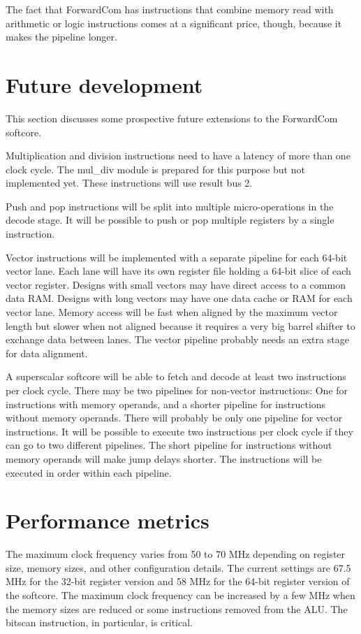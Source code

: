 \documentclass[11pt,a4paper,oneside,openright]{report}
\newcommand{\vv}{ \vspace{2mm} }   %
\begin{document}
The fact that ForwardCom has instructions that combine memory read with arithmetic or logic instructions comes at a significant price, though, because it makes the pipeline longer. 
\vv


\section{Future development}
This section discusses some prospective future extensions to the ForwardCom softcore.
\vv

Multiplication and division instructions need to have a latency of more than one clock cycle. The mul\_div module is prepared for this purpose but not implemented yet. These instructions will use result bus 2.
\vv

Push and pop instructions will be split into multiple micro-operations in the decode stage. It will be possible to push or pop multiple registers by a single instruction.
\vv

Vector instructions will be implemented with a separate pipeline for each 64-bit vector lane. Each lane will have its own register file holding a 64-bit slice of each vector register. Designs with small vectors may have direct access to a common data RAM. Designs with long vectors may have one data cache or RAM for each vector lane. Memory access will be fast when aligned by the maximum vector length but slower when not aligned because it requires a very big barrel shifter to exchange data between lanes. The vector pipeline probably needs an extra stage for data alignment.
\vv

A superscalar softcore will be able to fetch and decode at least two instructions per clock cycle. There may be two pipelines for non-vector instructions: One for instructions with memory operands, and a shorter pipeline for instructions without memory operands. There will probably be only one pipeline for vector instructions. It will be possible to execute two instructions per clock cycle if they can go to two different pipelines. The short pipeline for instructions without memory operands will make jump delays shorter. The instructions will be executed in order within each pipeline.
\vv


\section{Performance metrics}
The maximum clock frequency varies from 50 to 70 MHz depending on register size, memory sizes, and other configuration details. The current settings are 67.5 MHz for the 32-bit register version and 58 MHz for the 64-bit register version of the softcore. The maximum clock frequency can be increased by a few MHz when the memory sizes are reduced or some instructions removed from the ALU. The bitscan instruction, in particular, is critical.
\vv
\end{document}
